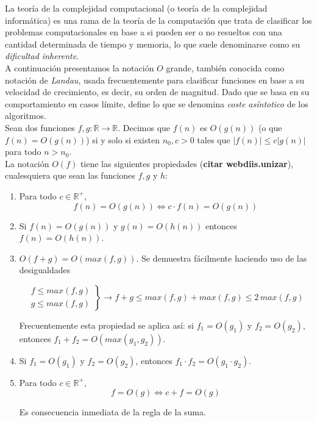 \documentclass[a4paper, 12pt, oneside]{book}
\begin{document}
	La teor\'ia de la complejidad computacional (o teor\'ia de la complejidad inform\'atica) es una rama de la teor\'ia de la computaci\'on que trata de clasificar los problemas computacionales en base a si pueden ser o no resueltos con una cantidad determinada de tiempo y memoria, lo que suele denominarse como su \textit{dificultad inherente}.
	\\
	
	A continuaci\'on presentamos la notaci\'on $O$ grande, tambi\'en conocida como notaci\'on de \textit{Landau}, usada frecuentemente para clasificar funciones en base a su velocidad de crecimiento, es decir, su orden de magnitud. Dado que se basa en su comportamiento en casos l\'imite, define lo que se denomina \textit{coste as\'intotico} de los algoritmos.
	\\
	
	Sean dos funciones $f,g: \mathbb{R} \longrightarrow \mathbb{R}$. Decimos que $f(n)$ es $O(g(n))$ (o que $f(n) = O(g(n))$) si y solo si existen $n_{0},c > 0$ tales que $|f(n)| \leq c|g(n)|$ para todo $n > n_{0}$.
	\\
	
	La notaci\'on $O(f)$ tiene las siguientes propiedades (\textbf{citar webdiis.unizar}), cualesquiera que sean las funciones $f,g$ y $h$:
	
	\begin{enumerate}
		\item Para todo $c \in \mathbb{R^{+}}$, $$ f(n) = O(g(n)) \Longleftrightarrow c \cdot f(n) = O(g(n)) $$
		
		\item Si $f(n) = O(g(n))$ y $g(n) = O(h(n))$ entonces $f(n) = O(h(n))$.
		
		\item $O(f+g) = O(max(f,g))$. Se demuestra f\'acilmente haciendo uso de las desigualdades
		
		\[\left .\begin{array}{ll}
			f \leq max(f,g) \\
			g \leq max(f,g)
		\end{array}\right\}\rightarrow f + g \leq max(f,g) + max(f,g) \leq 2\, max(f,g)
		\]
		
		Frecuentemente esta propiedad se aplica as\'i: si $f_{1} = O(g_{1})$ y $f_{2} = O(g_{2})$, entonces $f_{1} + f_{2} = O(max(g_{1},g_{2}))$.
		
		\item Si $f_{1} = O(g_{1})$ y $f_{2} = O(g_{2})$, entonces $f_{1} \cdot f_{2} = O(g_{1} \cdot g_{2})$.
		
		\item Para todo $c \in \mathbb{R^{+}}$, 
		$$f = O(g) \Longleftrightarrow c + f = O(g)$$
		
		Es consecuencia inmediata de la regla de la suma.
		
	\end{enumerate}
	
\end{document}
